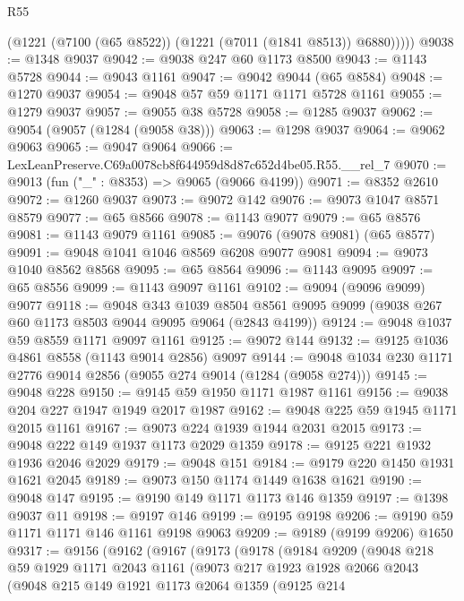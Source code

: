 \begin{lexlean}{R55}
\begin{coremodule}
          (@1221 (@7100 (@65 @8522)) (@1221 (@7011 (@1841 @8513)) @6880)))))
@9038 := @1348 @9037
@9042 := @9038 @247 @60 @1173 @8500
@9043 := @1143 @5728
@9044 := @9043 @1161
@9047 := @9042 @9044 (@65 @8584)
@9048 := @1270 @9037
@9054 := @9048 @57 @59 @1171 @1171 @5728 @1161
@9055 := @1279 @9037
@9057 := @9055 @38 @5728
@9058 := @1285 @9037
@9062 := @9054 (@9057 (@1284 (@9058 @38)))
@9063 := @1298 @9037
@9064 := @9062 @9063
@9065 := @9047 @9064
@9066 := LexLeanPreserve.C69a0078cb8f644959d8d87c652d4be05.R55.__rel_7
@9070 := @9013 (fun ("_" : @8353) => @9065 (@9066 @4199))
@9071 := @8352 @2610
@9072 := @1260 @9037
@9073 := @9072 @142
@9076 := @9073 @1047 @8571 @8579
@9077 := @65 @8566
@9078 := @1143 @9077
@9079 := @65 @8576
@9081 := @1143 @9079 @1161
@9085 := @9076 (@9078 @9081) (@65 @8577)
@9091 := @9048 @1041 @1046 @8569 @6208 @9077 @9081
@9094 := @9073 @1040 @8562 @8568
@9095 := @65 @8564
@9096 := @1143 @9095
@9097 := @65 @8556
@9099 := @1143 @9097 @1161
@9102 := @9094 (@9096 @9099) @9077
@9118 := @9048
    @343
    @1039
    @8504
    @8561
    @9095
    @9099
    (@9038 @267 @60 @1173 @8503 @9044 @9095 @9064 (@2843 @4199))
@9124 := @9048 @1037 @59 @8559 @1171 @9097 @1161
@9125 := @9072 @144
@9132 := @9125 @1036 @4861 @8558 (@1143 @9014 @2856) @9097
@9144 := @9048 @1034 @230 @1171 @2776 @9014 @2856 (@9055 @274 @9014 (@1284 (@9058 @274)))
@9145 := @9048 @228
@9150 := @9145 @59 @1950 @1171 @1987 @1161
@9156 := @9038 @204 @227 @1947 @1949 @2017 @1987
@9162 := @9048 @225 @59 @1945 @1171 @2015 @1161
@9167 := @9073 @224 @1939 @1944 @2031 @2015
@9173 := @9048 @222 @149 @1937 @1173 @2029 @1359
@9178 := @9125 @221 @1932 @1936 @2046 @2029
@9179 := @9048 @151
@9184 := @9179 @220 @1450 @1931 @1621 @2045
@9189 := @9073 @150 @1174 @1449 @1638 @1621
@9190 := @9048 @147
@9195 := @9190 @149 @1171 @1173 @146 @1359
@9197 := @1398 @9037 @11
@9198 := @9197 @146
@9199 := @9195 @9198
@9206 := @9190 @59 @1171 @1171 @146 @1161 @9198 @9063
@9209 := @9189 (@9199 @9206) @1650
@9317 := @9156
    (@9162
      (@9167
        (@9173
          (@9178
            (@9184
              @9209
              (@9048
                @218
                @59
                @1929
                @1171
                @2043
                @1161
                (@9073
                  @217
                  @1923
                  @1928
                  @2066
                  @2043
                  (@9048
                    @215
                    @149
                    @1921
                    @1173
                    @2064
                    @1359
                    (@9125
                      @214

\end{coremodule}
\end{lexlean}
